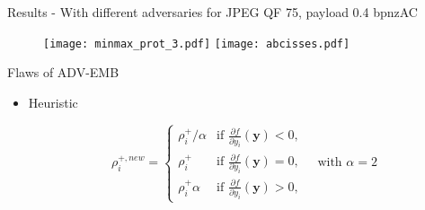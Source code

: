 \documentclass[10pt,aspectratio=169]{beamer}
\begin{document}
\begin{frame}{Results - With different adversaries for JPEG QF 75, payload 0.4 bpnzAC}
    \begin{figure}
        \texttt{[image: minmax\_prot\_3.pdf]}
        \texttt{[image: abcisses.pdf]}
    \end{figure}
\end{frame}


\begin{frame}{Flaws of ADV-EMB}

    \begin{itemize}

        \item Heuristic
        
            \begin{equation}
                \rho_{i}^{+, new} = 
                \left\{
                    \begin{array}{ll}
                        \rho_{i}^+/\alpha & \mbox{if } \frac{\partial f}{\partial y_{i}}\left(\mathbf{y}\right) < 0, \\
                        \rho_{i}^+ & \mbox{if } \frac{\partial f}{\partial y_{i}}\left(\mathbf{y}\right) = 0, \\
                        \rho_{i}^+ \alpha & \mbox{if } \frac{\partial f}{\partial y_{i}}\left(\mathbf{y}\right) > 0,
                    \end{array}
                \right.
                \quad \mbox{with } \alpha = 2
            \end{equation}

    \end{itemize}

\end{frame}
\end{document}
